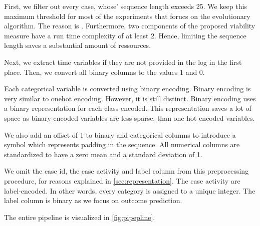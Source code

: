 \documentclass[./../../paper.tex]{subfiles}
\begin{document}
First, we filter out every case, whose' sequence length exceeds 25.  We keep this maximum threshold for most of the experiments that forucs on the evolutionary algorithm. The reason is . Furthermore, two components of the proposed viability measure have a run time complexity of at least 2. Hence, limiting the sequence length saves a substantial amount of ressources.

Next, we extract time variables if they are not provided in the log in the first place. Then, we convert all binary columns to the values 1 and 0. 

Each categorical variable is converted using binary encoding. Binary encoding is very similar to onehot encoding. However, it is still distinct. Binary encoding uses a binary representation for each class encoded. This representation saves a lot of space as binary encoded variables are less sparse, than one-hot encoded variables.  

We also add an offset of 1 to binary and categorical columns to introduce a symbol which represents padding in the sequence. All numerical columns are standardized to have a zero mean and a standard deviation of 1.

We omit the case id, the case activity and label column from this preprocessing procedure, for reasons explained in \autoref{sec:representation}. The case activity are label-encoded. In other words, every category is assigned to a unique integer. The label column is binary as we focus on outcome prediction.

The entire pipeline is visualized in \autoref{fig:pipepline}.

\end{document}
